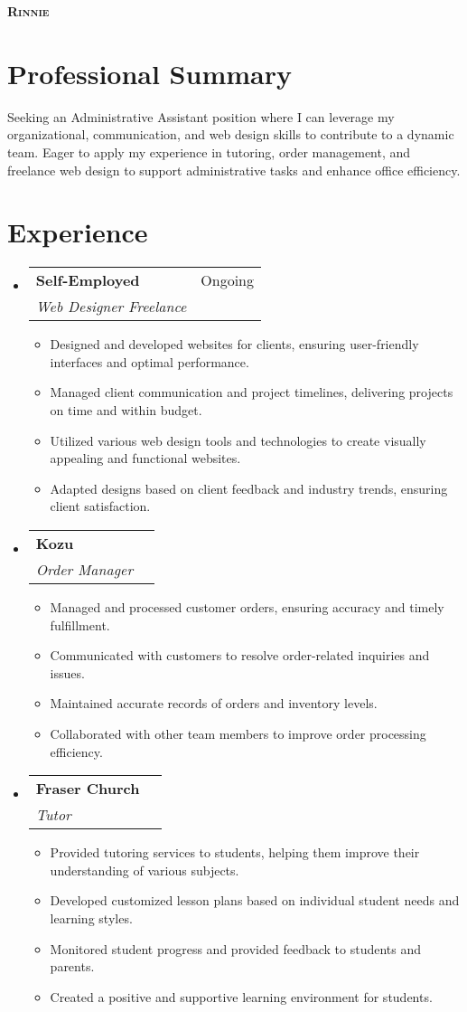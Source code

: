 \documentclass[letterpaper,11pt]{article}
\makeatletter
\newcommand{\resumeItem}[1]{
\item\small{
{#1 \vspace{-2pt}}
}
}
\newcommand{\resumeSubheading}[4]{
\vspace{-2pt}\item
\begin{tabular*}{0.97\textwidth}[t]{l@{\extracolsep{\fill}}r}
\textbf{#1} & #2 \\
\textit{\small#3} & \textit{\small #4} \\
\end{tabular*}\vspace{-7pt}
}
\newcommand{\resumeSubHeadingListStart}{\begin{itemize}[leftmargin=0.15in, label={}]}
\newcommand{\resumeSubHeadingListEnd}{\end{itemize}}
\newcommand{\resumeItemListStart}{\begin{itemize}}
\newcommand{\resumeItemListEnd}{\end{itemize}\vspace{-5pt}}
\makeatother
\begin{document}
\begin{center}
\textbf{\Huge \scshape Rinnie} \\ \vspace{1pt}
\small %
\end{center}


\section{Professional Summary} %
Seeking an Administrative Assistant position where I can leverage my organizational, communication, and web design skills to contribute to a dynamic team. Eager to apply my experience in tutoring, order management, and freelance web design to support administrative tasks and enhance office efficiency.

\section{Experience}
\resumeSubHeadingListStart
\resumeSubheading{Self-Employed}{Ongoing}{Web Designer Freelance}{}
\resumeItemListStart
\resumeItem{Designed and developed websites for clients, ensuring user-friendly interfaces and optimal performance.}
\resumeItem{Managed client communication and project timelines, delivering projects on time and within budget.}
\resumeItem{Utilized various web design tools and technologies to create visually appealing and functional websites.}
\resumeItem{Adapted designs based on client feedback and industry trends, ensuring client satisfaction.}
\resumeItemListEnd

\resumeSubheading{Kozu}{}{Order Manager}{}
\resumeItemListStart
\resumeItem{Managed and processed customer orders, ensuring accuracy and timely fulfillment.}
\resumeItem{Communicated with customers to resolve order-related inquiries and issues.}
\resumeItem{Maintained accurate records of orders and inventory levels.}
\resumeItem{Collaborated with other team members to improve order processing efficiency.}
\resumeItemListEnd

\resumeSubheading{Fraser Church}{}{Tutor}{}
\resumeItemListStart
\resumeItem{Provided tutoring services to students, helping them improve their understanding of various subjects.}
\resumeItem{Developed customized lesson plans based on individual student needs and learning styles.}
\resumeItem{Monitored student progress and provided feedback to students and parents.}
\resumeItem{Created a positive and supportive learning environment for students.}
\resumeItemListEnd
\resumeSubHeadingListEnd
\end{document}
